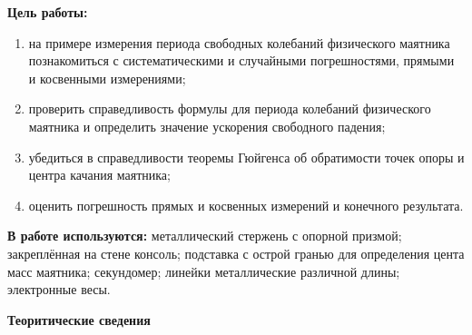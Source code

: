 \documentclass[a4paper,12pt]{article} %
\begin{document}
\medskip
\textbf{Цель работы:}
\begin{enumerate}
	\item на примере измерения периода свободных колебаний физического маятника познакомиться с систематическими и случайными погрешностями, прямыми и косвенными измерениями;
	\item проверить справедливость формулы для периода колебаний физического маятника и определить значение ускорения свободного падения;
	\item убедиться в справедливости теоремы Гюйгенса об обратимости точек опоры и центра качания маятника;
	\item оценить погрешность прямых и косвенных измерений и конечного результата.
\end{enumerate}

\medskip

\textbf{В работе используются:} металлический стержень с опорной призмой; закреплённая на стене консоль; подставка с острой гранью для определения цента масс маятника; секундомер; линейки металлические различной длины; электронные весы.
\medskip




\textbf{Теоритические сведения}
\end{document}
